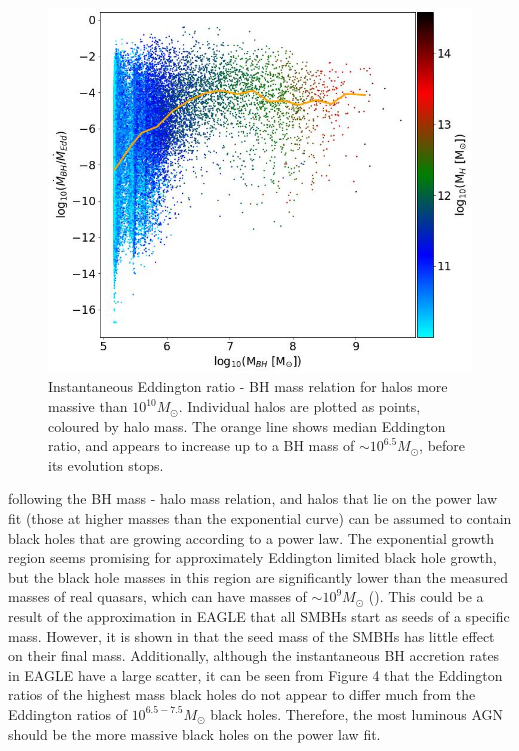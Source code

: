 \documentclass[12pt, twocolumn]{article}%
\begin{document}
\begin{figure}[H]
\centering
\includegraphics[width=\linewidth]{Plot_12.jpeg}
\caption{Instantaneous Eddington ratio - BH mass relation for halos more massive than $10^{10}M_\odot$. Individual halos are plotted as points, coloured by halo mass. The orange line shows median Eddington ratio, and appears to increase up to a BH mass of $\sim10^{6.5}M_\odot$, before its evolution stops.}
\label{fig:4}
\end{figure}

\vspace{3cm}

 \noindent following the BH mass - halo mass relation, and halos that lie on the power law fit (those at higher masses than the exponential curve) can be assumed to contain black holes that are growing according to a power law. The exponential growth region seems promising for approximately Eddington limited black hole growth, but the black hole masses in this region are significantly lower than the measured masses of real quasars, which can have masses of $\sim10^9M_\odot$ (\cite{Marshall}). This could be a result of the approximation in EAGLE that all SMBHs start as seeds of a specific mass. However, it is shown in \cite{Quasar} that the seed mass of the SMBHs has little effect on their final mass. Additionally, although the instantaneous BH accretion rates in EAGLE have a large scatter, it can be seen from Figure 4 that the Eddington ratios of the highest mass black holes do not appear to differ much from the Eddington ratios of $10^{6.5-7.5}M_\odot$ black holes. Therefore, the most luminous AGN should be the more massive black holes on the power law fit.\par
\end{document}
